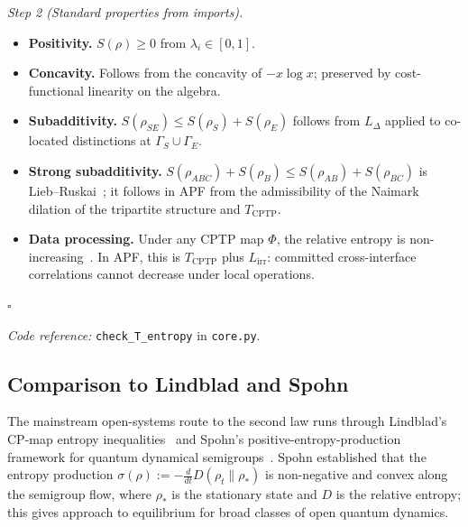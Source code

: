 \documentclass[11pt]{article}
\theoremstyle{remark}
\newcommand{\coderef}[2]{\smallskip\noindent\textit{Code reference:} \texttt{#1} in \texttt{#2}.}
\begin{document}
\textit{Step 2 (Standard properties from imports).}
\begin{itemize}[nosep]
  \item \textbf{Positivity.}  $S(\rho) \geq 0$ from $\lambda_i \in [0,1]$.
  \item \textbf{Concavity.}  Follows from the concavity of $-x\log x$; preserved by cost-functional linearity on the algebra.
  \item \textbf{Subadditivity.}  $S(\rho_{SE}) \leq S(\rho_S) + S(\rho_E)$ follows from $L_\Delta$ applied to co-located distinctions at $\Gamma_S \cup \Gamma_E$.
  \item \textbf{Strong subadditivity.}  $S(\rho_{ABC}) + S(\rho_B) \leq S(\rho_{AB}) + S(\rho_{BC})$ is Lieb--Ruskai~\cite{LiebRuskai1973}; it follows in APF from the admissibility of the Naimark dilation of the tripartite structure and $T_{\mathrm{CPTP}}$.
  \item \textbf{Data processing.}  Under any CPTP map $\Phi$, the relative entropy is non-increasing~\cite{Wehrl1978}.  In APF, this is $T_{\mathrm{CPTP}}$ plus $L_{\mathrm{irr}}$: committed cross-interface correlations cannot decrease under local operations.
\end{itemize}
\hfill$\square$

\coderef{check\_T\_entropy}{core.py}

\subsection{Comparison to Lindblad and Spohn}

The mainstream open-systems route to the second law runs through Lindblad's
CP-map entropy inequalities~\cite{Lindblad1976} and Spohn's
positive-entropy-production framework for quantum dynamical
semigroups~\cite{Spohn1978}.  Spohn established that the entropy production
$\sigma(\rho) := -\frac{d}{dt} D(\rho_t \| \rho_*)$ is non-negative and
convex along the semigroup flow, where $\rho_*$ is the stationary state and
$D$ is the relative entropy; this gives approach to equilibrium for broad
classes of open quantum dynamics.
\end{document}
